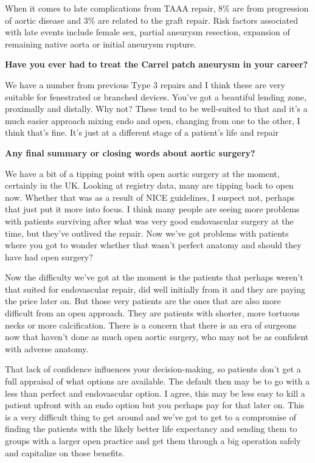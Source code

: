 \documentclass[
]{book}
\begin{document}
When it comes to late complications from TAAA repair, 8\% are from
progression of aortic disease and 3\% are related to the graft repair.
Risk factors associated with late events include female sex, partial
aneurysm resection, expansion of remaining native aorta or initial
aneurysm rupture.\citep{clouse2003}

\textbf{Have you ever had to treat the Carrel patch aneurysm in your career?}

We have a number from previous Type 3 repairs and I think these are very
suitable for fenestrated or branched devices. You've got a beautiful
lending zone, proximally and distally. Why not? These tend to be
well-suited to that and it's a much easier approach mixing endo and
open, changing from one to the other, I think that's fine. It's just at
a different stage of a patient's life and repair

\textbf{Any final summary or closing words about aortic surgery?}

We have a bit of a tipping point with open aortic surgery at the moment,
certainly in the UK. Looking at registry data, many are tipping back to
open now. Whether that was as a result of NICE guidelines, I suspect
not, perhaps that just put it more into focus. I think many people are
seeing more problems with patients surviving after what was very good
endovascular surgery at the time, but they've outlived the repair. Now
we've got problems with patients where you got to wonder whether that
wasn't perfect anatomy and should they have had open surgery?

Now the difficulty we've got at the moment is the patients that perhaps
weren't that suited for endovascular repair, did well initially from it
and they are paying the price later on. But those very patients are the
ones that are also more difficult from an open approach. They are
patients with shorter, more tortuous necks or more calcification. There
is a concern that there is an era of surgeons now that haven't done as
much open aortic surgery, who may not be as confident with adverse
anatomy.

That lack of confidence influences your decision-making, so patients
don't get a full appraisal of what options are available. The default
then may be to go with a less than perfect and endovascular option. I
agree, this may be less easy to kill a patient upfront with an endo
option but you perhaps pay for that later on. This is a very difficult
thing to get around and we've got to get to a compromise of finding the
patients with the likely better life expectancy and sending them to
groups with a larger open practice and get them through a big operation
safely and capitalize on those benefits.
\end{document}
